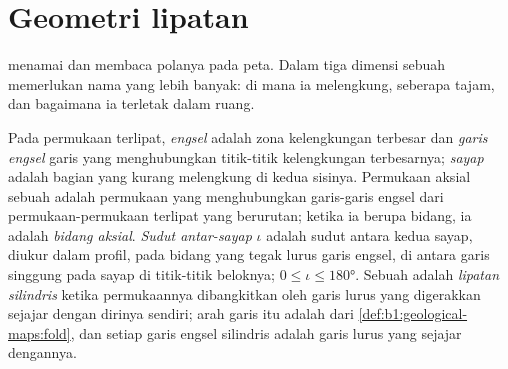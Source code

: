 \section{Geometri lipatan}\label{sec:b1:faults-folds-fabrics:folds}

 menamai  dan membaca polanya pada peta. Dalam tiga dimensi sebuah  memerlukan nama yang lebih banyak: di mana ia melengkung, seberapa tajam, dan bagaimana ia terletak dalam ruang.

\begin{definition}\label{def:b1:faults-folds-fabrics:fold-elements}
Pada permukaan terlipat, \emph{engsel} adalah zona kelengkungan terbesar dan \emph{garis engsel} garis yang menghubungkan titik-titik kelengkungan terbesarnya; \emph{sayap} adalah bagian yang kurang melengkung di kedua sisinya. Permukaan aksial sebuah  adalah permukaan yang menghubungkan garis-garis engsel dari permukaan-permukaan terlipat yang berurutan; ketika ia berupa bidang, ia adalah \emph{bidang aksial}. \emph{Sudut antar-sayap} $\iota$ adalah sudut antara kedua sayap, diukur dalam profil, pada bidang yang tegak lurus garis engsel, di antara garis singgung pada sayap di titik-titik beloknya; $0 \le \iota \le \ang{180}$. Sebuah  adalah \emph{lipatan silindris} ketika permukaannya dibangkitkan oleh garis lurus yang digerakkan sejajar dengan dirinya sendiri; arah garis itu adalah  dari \cref{def:b1:geological-maps:fold}, dan setiap garis engsel  silindris adalah garis lurus yang sejajar dengannya.
\end{definition}

